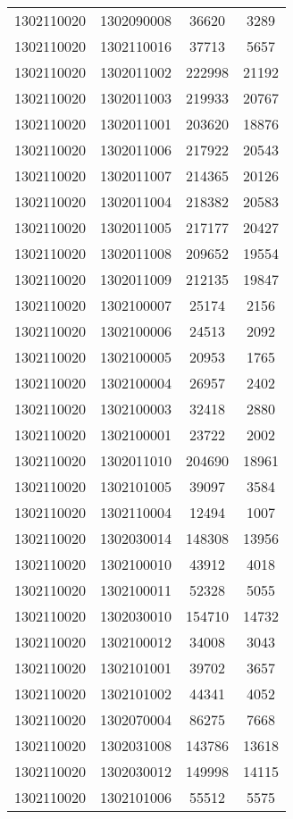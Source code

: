 \begin{longtable}[h]{llcc}
		1302110020 & 1302090008 & 36620 & 3289\\
		1302110020 & 1302110016 & 37713 & 5657\\
		1302110020 & 1302011002 & 222998 & 21192\\
		1302110020 & 1302011003 & 219933 & 20767\\
		1302110020 & 1302011001 & 203620 & 18876\\
		1302110020 & 1302011006 & 217922 & 20543\\
		1302110020 & 1302011007 & 214365 & 20126\\
		1302110020 & 1302011004 & 218382 & 20583\\
		1302110020 & 1302011005 & 217177 & 20427\\
		1302110020 & 1302011008 & 209652 & 19554\\
		1302110020 & 1302011009 & 212135 & 19847\\
		1302110020 & 1302100007 & 25174 & 2156\\
		1302110020 & 1302100006 & 24513 & 2092\\
		1302110020 & 1302100005 & 20953 & 1765\\
		1302110020 & 1302100004 & 26957 & 2402\\
		1302110020 & 1302100003 & 32418 & 2880\\
		1302110020 & 1302100001 & 23722 & 2002\\
		1302110020 & 1302011010 & 204690 & 18961\\
		1302110020 & 1302101005 & 39097 & 3584\\
		1302110020 & 1302110004 & 12494 & 1007\\
		1302110020 & 1302030014 & 148308 & 13956\\
		1302110020 & 1302100010 & 43912 & 4018\\
		1302110020 & 1302100011 & 52328 & 5055\\
		1302110020 & 1302030010 & 154710 & 14732\\
		1302110020 & 1302100012 & 34008 & 3043\\
		1302110020 & 1302101001 & 39702 & 3657\\
		1302110020 & 1302101002 & 44341 & 4052\\
		1302110020 & 1302070004 & 86275 & 7668\\
		1302110020 & 1302031008 & 143786 & 13618\\
		1302110020 & 1302030012 & 149998 & 14115\\
		1302110020 & 1302101006 & 55512 & 5575\\

\end{longtable}
